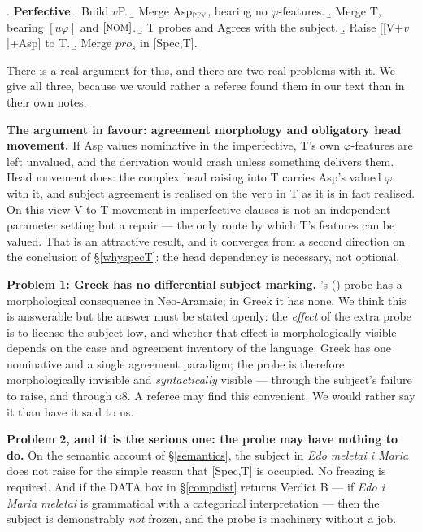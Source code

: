 \documentclass[11pt]{article}
\newcommand{\citeposs}[1]{\citeauthor{#1}'s (\citeyear{#1})}
\newcommand{\prs}{\ensuremath{pro_{s}}\xspace}
\begin{document}
\ex. \label{derivPFV}
\textbf{Perfective}
\a. Build $v$P.
\b. Merge Asp$_{\textsc{pfv}}$, bearing no $\varphi$-features.
\b. Merge T, bearing $[u\varphi]$ and $[\textsc{nom}]$.
\b. T probes and Agrees with the subject.
\b. Raise [[V+$v$]+Asp] to T.
\b. Merge \prs{} in [Spec,T].

\medskip
There is a real argument for this, and there are two real problems with it.  We give all three, because we would rather a referee found them in our text than in their own notes.

\medskip\noindent\textbf{The argument in favour: agreement morphology and obligatory head movement.}  If Asp values nominative in the imperfective, T's own $\varphi$-features are left unvalued, and the derivation would crash unless something delivers them.  Head movement does: the complex head raising into T carries Asp's valued $\varphi$ with it, and subject agreement is realised on the verb in T as it is in fact realised.  On this view V-to-T movement in imperfective clauses is not an independent parameter setting but a repair --- the only route by which T's features can be valued.  That is an attractive result, and it converges from a second direction on the conclusion of \S\ref{whyspecT}: the head dependency is necessary, not optional.

\medskip\noindent\textbf{Problem 1: Greek has no differential subject marking.}  \citeposs{kalin-vanurk:15} probe has a morphological consequence in Neo-Aramaic; in Greek it has none.  We think this is answerable but the answer must be stated openly: the \emph{effect} of the extra probe is to license the subject low, and whether that effect is morphologically visible depends on the case and agreement inventory of the language.  Greek has one nominative and a single agreement paradigm; the probe is therefore morphologically invisible and \emph{syntactically} visible --- through the subject's failure to raise, and through \textsc{g8}.  A referee may find this convenient.  We would rather say it than have it said to us.

\medskip\noindent\textbf{Problem 2, and it is the serious one: the probe may have nothing to do.}  On the semantic account of \S\ref{semantics}, the subject in \emph{Edo meletai i Maria} does not raise for the simple reason that [Spec,T] is occupied.  No freezing is required.  And if the DATA box in \S\ref{compdist} returns Verdict B --- if \emph{Edo i Maria meletai} is grammatical with a categorical interpretation --- then the subject is demonstrably \emph{not} frozen, and the probe is machinery without a job.
\end{document}
